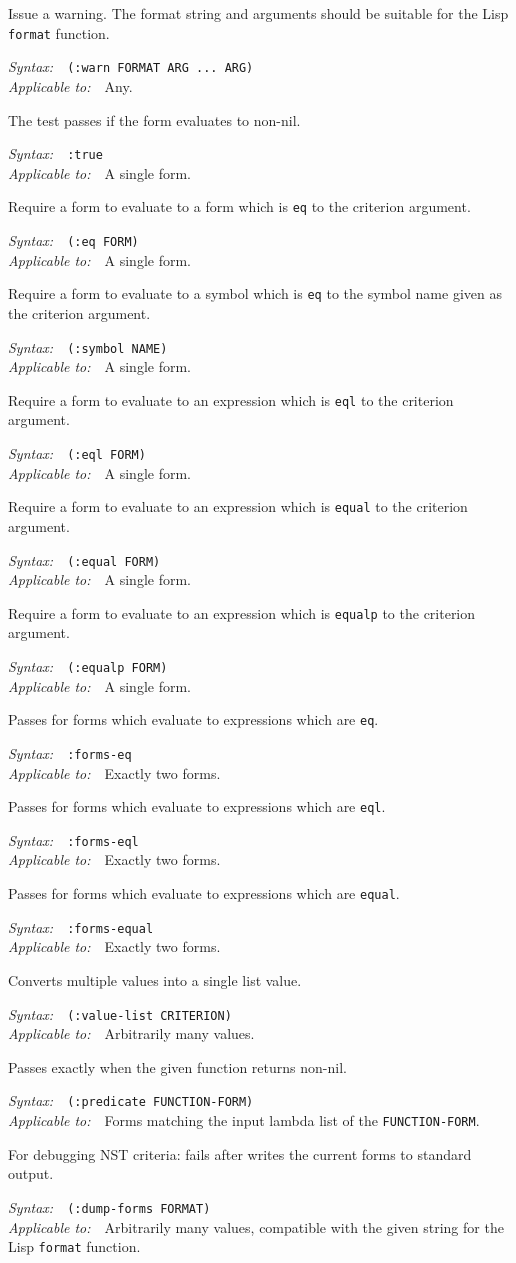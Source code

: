 \documentclass{article}
\newenvironment{criteria}%
{\begin{list}{}
    {\setlength{\labelwidth}{0pt}
     \setlength{\leftmargin}{2em}
     \setlength{\rightmargin}{1em}
     \setlength{\itemindent}{0em}}}%
  {\end{list}}
\def\criterion#1#2#3#4{\item[\bfseries #1] #4\par
  \emph{Syntax:}~~\texttt{#2}\\ \emph{Applicable to:}~~#3}
\begin{document}
\begin{criteria}

  \criterion{:warn}{(:warn FORMAT ARG ...\ ARG)}{Any.}{Issue a warning.
    The format string and arguments should be suitable for the Lisp
    \texttt{format} function.}

  \criterion{:true}{:true}{A single form.}{The test passes if the
    form evaluates to non-nil.}

  \criterion{:eq}{(:eq FORM)}{A single form.}{Require a form to
    evaluate to a form which is \texttt{eq} to the criterion argument.}

  \criterion{:symbol}{(:symbol NAME)}{A single form.}{Require a form
    to evaluate to a symbol which is \texttt{eq} to the symbol name
    given as the criterion argument.}

  \criterion{:eql}{(:eql FORM)}{A single form.}{Require a form to
    evaluate to an expression which is \texttt{eql} to the criterion
    argument.}

  \criterion{:equal}{(:equal FORM)}{A single form.}{Require a form to
    evaluate to an expression which is \texttt{equal} to the criterion
    argument.}

  \criterion{:equalp}{(:equalp FORM)}{A single form.}{Require a form
    to evaluate to an expression which is \texttt{equalp} to the
    criterion argument.}

  \criterion{:forms-eq}{:forms-eq}{Exactly two forms.}{Passes for
    forms which evaluate to expressions which are \texttt{eq}.}

  \criterion{:forms-eql}{:forms-eql}{Exactly two forms.}{Passes for
    forms which evaluate to expressions which are \texttt{eql}.}

  \criterion{:forms-equal}{:forms-equal}{Exactly two forms.}{Passes
    for forms which evaluate to expressions which are \texttt{equal}.}

  \criterion{:value-list}
  {(:value-list CRITERION)}
  {Arbitrarily many values.}
  {Converts multiple values into a single list value.}

  \criterion{:predicate}{(:predicate FUNCTION-FORM)}
  {Forms matching the input lambda list of the \texttt{FUNCTION-FORM}.}
  {Passes exactly when the given function returns non-nil.}

  \criterion{:dump-forms}{(:dump-forms FORMAT)} {Arbitrarily many
    values, compatible with the given string for the Lisp
    \texttt{format} function.}{For debugging NST criteria: fails after
    writes the current forms to standard output.}


\end{criteria}
\end{document}
